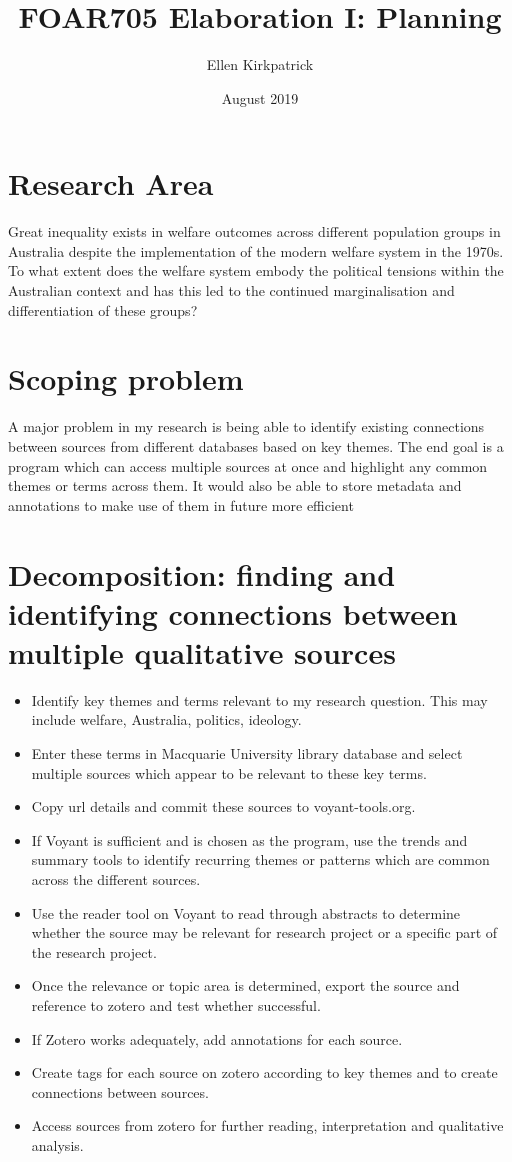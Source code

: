 \documentclass{article}
\title{FOAR705 Elaboration I: Planning}
\author{Ellen Kirkpatrick }
\date{August 2019}
\begin{document}
\maketitle

\section{Research Area}
Great inequality exists in welfare outcomes across different population groups in Australia despite the implementation of the modern welfare system in the 1970s. To what extent does the welfare system embody the political tensions within the Australian context and has this led to the continued marginalisation and differentiation of these groups?

\section{Scoping problem}
A major problem in my research is being able to identify existing connections between sources from different databases based on key themes. The end goal is a program which can access multiple sources at once and highlight any common themes or terms across them. It would also be able to store metadata and annotations to make use of them in future more efficient

\section{Decomposition: finding and identifying connections between multiple qualitative sources}
\begin{itemize}
    \item Identify key themes and terms relevant to my research question. This may include welfare, Australia, politics, ideology.
    \item Enter these terms in Macquarie University library database and select multiple sources which appear to be relevant to these key terms. 
    \item Copy url details and commit these sources to  voyant-tools.org. 
    \item If Voyant is sufficient and is chosen as the program, use the trends and summary tools to identify recurring themes or patterns which are common across the different sources. 
    \item Use the reader tool on Voyant to read through abstracts to determine whether the source may be relevant for research project or a specific part of the research project.
    \item Once the relevance or topic area is determined, export the source and reference to zotero and test whether successful. 
    \item If Zotero works adequately, add annotations for each source.
    \item Create tags for each source on zotero according to key themes and to create connections between sources.
    \item Access sources from zotero for further reading, interpretation and qualitative analysis. 
\end{itemize}
\end{document}

